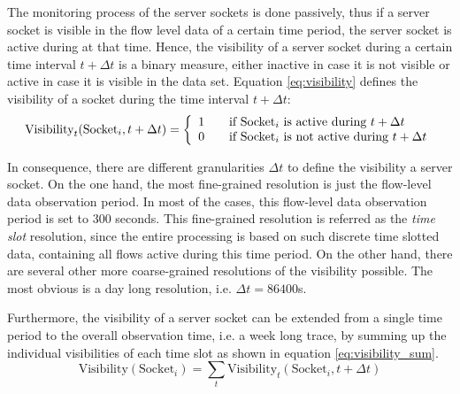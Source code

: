 The monitoring process of the server sockets is done passively, thus if a server socket is visible in the flow level data of a certain time period, the server socket is active during at that time. Hence, the visibility of a server socket during a certain time interval $t+\Delta{t}$ is a binary measure, either inactive in case it is not visible or active in case it is visible in the data set. Equation \ref{eq:visibility} defines the visibility of a socket during the time interval $t+\Delta{t}$: 
\begin{equation}
	\text{Visibility}_t(\text{Socket}_i,t+\Delta{t}) = \left\{ 
	\begin{array}{l l}
		1 & \quad \text{if $\text{Socket}_i$ is active during $t+\Delta{t}$}\\
		0 & \quad \text{if $\text{Socket}_i$ is not active during $t+\Delta{t}$}\\
	\end{array}
	\right. 
	\label{eq:visibility} 
\end{equation}

In consequence, there are different granularities $\Delta{t}$ to define the visibility a server socket. On the one hand, the most fine-grained resolution is just the flow-level data observation period. In most of the cases, this flow-level data observation period is set to 300 seconds. This fine-grained resolution is referred as the \emph{time slot} resolution, since the entire processing is based on such discrete time slotted data, containing all flows active during this time period. 
On the other hand, there are several other more coarse-grained resolutions of the visibility possible. The most obvious is a day long resolution, i.e. $\Delta{t} = 86400$s.

Furthermore, the visibility of a server socket can be extended from a single time period to the overall observation time, i.e. a week long trace, by summing up the individual visibilities of each time slot as shown in equation \ref{eq:visibility_sum}.
\begin{equation}
	\text{Visibility}(\text{Socket}_i) = \sum_{t} \text{Visibility}_t(\text{Socket}_i,t+\Delta{t})
	\label{eq:visibility_sum} 
\end{equation}

